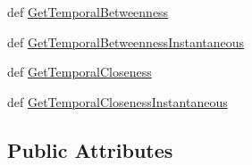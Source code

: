 \begin{DoxyCompactItemize}
\item 
def \hyperlink{classpathpy_1_1TemporalNetwork_1_1TemporalNetwork_a948503bbe0104c9678778cdecfe8ceb7}{Get\-Temporal\-Betweenness}
\item 
def \hyperlink{classpathpy_1_1TemporalNetwork_1_1TemporalNetwork_aa6a91612301e802d287f1fb58fe31961}{Get\-Temporal\-Betweenness\-Instantaneous}
\item 
def \hyperlink{classpathpy_1_1TemporalNetwork_1_1TemporalNetwork_a9dd08ea1ab218cb69b2fdd56cbcab61f}{Get\-Temporal\-Closeness}
\item 
def \hyperlink{classpathpy_1_1TemporalNetwork_1_1TemporalNetwork_ac73ea9fa5c13c1df5ac101d45473243d}{Get\-Temporal\-Closeness\-Instantaneous}
\end{DoxyCompactItemize}
\subsection*{Public Attributes}
